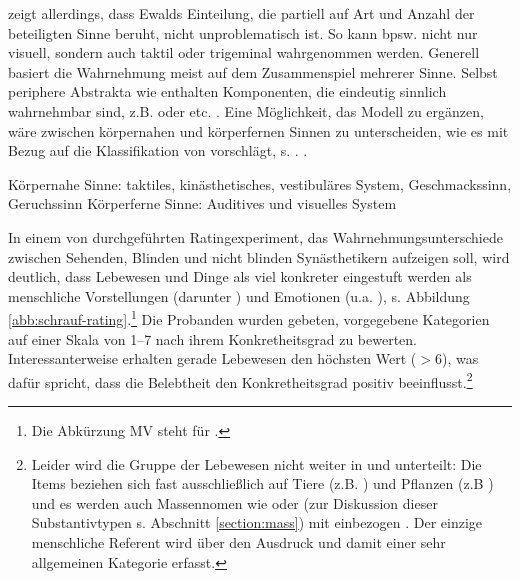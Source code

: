 \textcite{Schrauf2011} zeigt allerdings, dass Ewalds Einteilung, die partiell auf Art und Anzahl der beteiligten Sinne beruht, nicht unproblematisch ist. So kann  bpsw. nicht nur visuell, sondern auch taktil oder trigeminal wahrgenommen werden. Generell basiert die Wahrnehmung meist auf dem Zusammenspiel mehrerer Sinne. Selbst periphere Abstrakta wie  enthalten Komponenten, die eindeutig sinnlich wahrnehmbar sind, z.B.  oder  etc. \parencite[vgl.][41]{Schrauf2011}. 
Eine Möglichkeit, das Modell zu ergänzen, wäre zwischen körpernahen und körperfernen Sinnen zu unterscheiden, wie es \textcite[42]{Schrauf2011} mit Bezug auf die Klassifikation von \textcite{Zimmer2007} vorschlägt, s. .  \parencite[42]{Schrauf2011}.   

\begin{exe}
	\ex \label{sinne}
	\begin{xlist}
		\ex \label{nah} Körpernahe Sinne:  taktiles, kinästhetisches, vestibuläres System, Geschmackssinn, Geruchssinn
		\ex \label{fern} Körperferne Sinne: Auditives und visuelles System
	\end{xlist}
\end{exe}

In einem von \textcite[163--166]{Schrauf2011} durchgeführten Ratingexperiment, das Wahrnehmungsunterschiede zwischen Sehenden, Blinden und nicht blinden Synästhetikern aufzeigen soll, wird deutlich, dass Lebewesen und Dinge als viel konkreter eingestuft werden als menschliche Vorstellungen (darunter ) und Emotionen (u.a. ), s. Abbildung \ref{abb:schrauf-rating}.\footnote{Die Abkürzung MV steht für .} Die Probanden wurden gebeten, vorgegebene Kategorien auf einer Skala von 1--7 nach ihrem Konkretheitsgrad zu bewerten. Interessanterweise erhalten gerade Lebewesen den höchsten Wert ($>6$), was dafür spricht, dass die Belebtheit den Konkretheitsgrad positiv beeinflusst.\footnote{Leider wird die Gruppe der Lebewesen nicht weiter in  und  unterteilt: Die Items beziehen sich fast ausschließlich auf Tiere (z.B. ) und Pflanzen (z.B ) und es werden auch Massennomen wie  oder  (zur Diskussion dieser Substantivtypen s. Abschnitt \ref{section:mass}) mit einbezogen \parencite[143]{Schrauf2011}. Der einzige menschliche Referent wird über den Ausdruck  und damit einer sehr allgemeinen Kategorie erfasst.}

